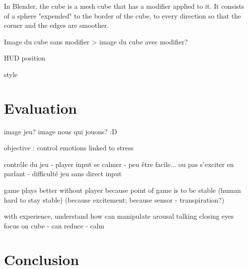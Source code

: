 \documentclass[12pt,a4paper]{article}
\begin{document}

In Blender, the cube is a mesh cube that has a modifier applied to it. It consists of a sphere "expended" to the border of the cube, to every direction so that the corner and the edges are smoother.

Image du cube sans modifier > image du cube avec modifier?


HUD position

style


\section{Evaluation}

image jeu?
image nous qui jouons? :D 

objective : control emotions linked to stress

contrôle du jeu - player input
se calmer - peu être facile... ou pas
s'exciter en parlant
- difficulté jeu sans direct input

game plays better without player
because point of game is to be stable
(human hard to stay stable)
(because excitement; because sensor - transpiration?)

with experience, understand how can manipulate arousal
talking
closing eyes
focus on cube - can reduce - calm

\section{Conclusion}
\end{document}
